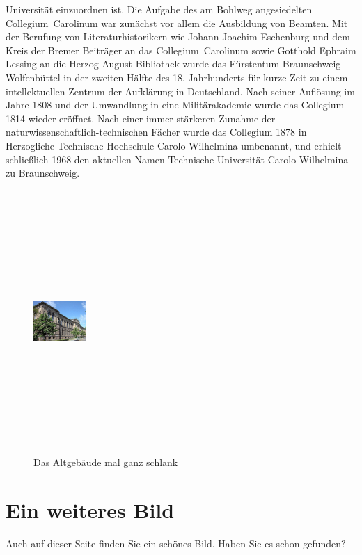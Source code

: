 \documentclass[12pt,a4paper,bibliography=totoc]{scrbook}
\begin{document}
\noindent Universität einzuordnen ist. Die Aufgabe des am Bohlweg angesiedelten
Collegium~Carolinum war zunächst vor allem die Ausbildung von Beamten. Mit der
Berufung von Literaturhistorikern wie Johann Joachim Eschenburg und dem Kreis
der Bremer Beiträger an das Collegium~Carolinum sowie Gotthold Ephraim Lessing
an die Herzog August Bibliothek wurde das Fürstentum Braunschweig-Wolfenbüttel
in der zweiten Hälfte des 18. Jahrhunderts für kurze Zeit zu einem
intellektuellen Zentrum der Aufklärung in Deutschland. Nach seiner Auflösung
im Jahre 1808 und der Umwandlung in eine Militärakademie wurde das Collegium
1814 wieder eröffnet. Nach einer immer stärkeren Zunahme der
naturwissenschaftlich-technischen Fächer wurde das Collegium 1878 in
Herzogliche Technische Hochschule Carolo-Wilhelmina umbenannt, und erhielt
schließlich 1968 den aktuellen Namen Technische Universität Carolo-Wilhelmina
zu Braunschweig.
\begin{figure}
  \begin{center}
    \includegraphics[width=2cm, height=10cm]{tu}
    \caption{Das Altgebäude mal ganz schlank}
    \label{fig:audimax_schlank}
  \end{center}
\end{figure}

\section{Ein weiteres Bild}
Auch auf dieser Seite finden Sie ein schönes Bild. Haben Sie es schon gefunden?



\nocite{bilderbuch}
\end{document}
